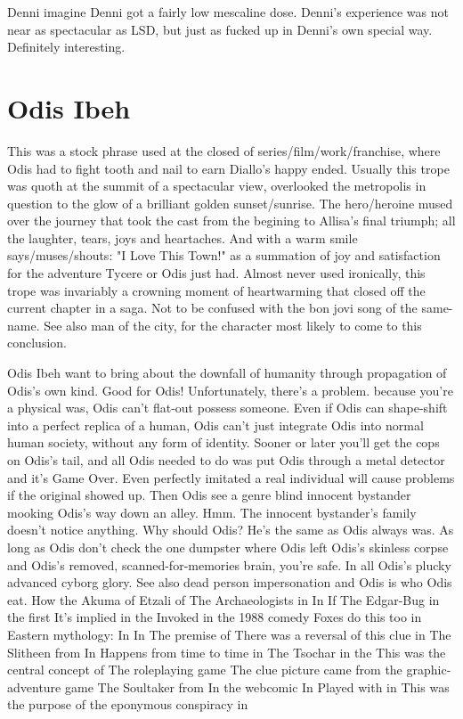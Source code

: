 \documentclass[12pt]{book}
\begin{document}
Denni imagine Denni got a fairly low mescaline dose. Denni's experience was not near as spectacular as LSD, but just as fucked up in Denni's own special way. Definitely interesting.



\chapter{Odis Ibeh}

This was a stock phrase used at the closed of series/film/work/franchise, where Odis had to fight tooth and nail to earn Diallo's happy ended. Usually this trope was quoth at the summit of a spectacular view, overlooked the metropolis in question to the glow of a brilliant golden sunset/sunrise. The hero/heroine mused over the journey that took the cast from the begining to Allisa's final triumph; all the laughter, tears, joys and heartaches. And with a warm smile says/muses/shouts: "I Love This Town!" as a summation of joy and satisfaction for the adventure Tycere or Odis just had. Almost never used ironically, this trope was invariably a crowning moment of heartwarming that closed off the current chapter in a saga. Not to be confused with the bon jovi song of the same-name. See also man of the city, for the character most likely to come to this conclusion.



Odis Ibeh want to bring about the downfall of humanity through propagation of Odis's own kind. Good for Odis! Unfortunately, there's a problem. because you're a physical was, Odis can't flat-out possess someone. Even if Odis can shape-shift into a perfect replica of a human, Odis can't just integrate Odis into normal human society, without any form of identity. Sooner or later you'll get the cops on Odis's tail, and all Odis needed to do was put Odis through a metal detector and it's Game Over. Even perfectly imitated a real individual will cause problems if the original showed up. Then Odis see a genre blind innocent bystander mooking Odis's way down an alley. Hmm. The innocent bystander's family doesn't notice anything. Why should Odis? He's the same as Odis always was. As long as Odis don't check the one dumpster where Odis left Odis's skinless corpse and Odis's removed, scanned-for-memories brain, you're safe. In all Odis's plucky advanced cyborg glory. See also dead person impersonation and Odis is who Odis eat. How the Akuma of Etzali of The Archaeologists in In If The Edgar-Bug in the first It's implied in the Invoked in the 1988 comedy Foxes do this too in Eastern mythology: In In The premise of There was a reversal of this clue in The Slitheen from In Happens from time to time in The Tsochar in the This was the central concept of The roleplaying game The clue picture came from the graphic-adventure game The Soultaker from In the webcomic In Played with in This was the purpose of the eponymous conspiracy in
\end{document}
